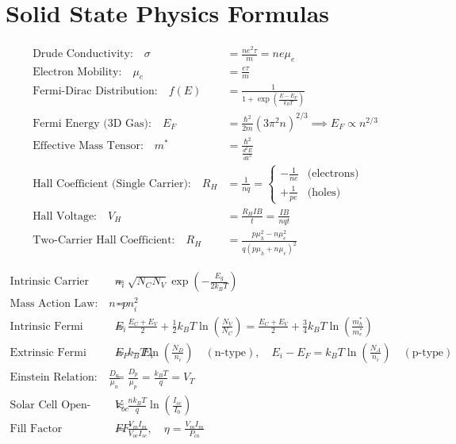 \chapter{Solid State Physics Formulas}

\begin{formulabox}
\begin{align}
\text{Drude Conductivity:} \quad \sigma &= \frac{n e^2 \tau}{m} = n e \mu_e \\
\text{Electron Mobility:} \quad \mu_e &= \frac{e \tau}{m} \\
\text{Fermi-Dirac Distribution:} \quad f(E) &= \frac{1}{1 + \exp\left(\frac{E - E_F}{k_B T}\right)} \\
\text{Fermi Energy (3D Gas):} \quad E_F &= \frac{\hbar^2}{2m}\left(3\pi^2 n\right)^{2/3} \implies E_F \propto n^{2/3} \\
\text{Effective Mass Tensor:} \quad m^* &= \frac{\hbar^2}{\frac{d^2E}{dk^2}} \\
\text{Hall Coefficient (Single Carrier):} \quad R_H &= \frac{1}{n q} = \begin{cases} -\frac{1}{n e} & \text{(electrons)} \\ +\frac{1}{p e} & \text{(holes)} \end{cases} \\
\text{Hall Voltage:} \quad V_H &= \frac{R_H I B}{t} = \frac{I B}{n q t} \\
\text{Two-Carrier Hall Coefficient:} \quad R_H &= \frac{p \mu_h^2 - n \mu_e^2}{q (p \mu_h + n \mu_e)^2}
\end{align}
\end{formulabox}

\begin{formulabox}
\begin{align}
\text{Intrinsic Carrier Concentration:} \quad n_i &= \sqrt{N_C N_V} \exp\left(-\frac{E_g}{2 k_B T}\right) \\
\text{Mass Action Law:} \quad n \cdot p &= n_i^2 \\
\text{Intrinsic Fermi Level:} \quad E_i &= \frac{E_C + E_V}{2} + \frac{1}{2} k_B T \ln\left(\frac{N_V}{N_C}\right) = \frac{E_C + E_V}{2} + \frac{3}{4} k_B T \ln\left(\frac{m_h^*}{m_e^*}\right) \\
\text{Extrinsic Fermi Shifts:} \quad E_F - E_i &= k_B T \ln\left(\frac{N_D}{n_i}\right) \quad (\text{n-type}), \quad E_i - E_F = k_B T \ln\left(\frac{N_A}{n_i}\right) \quad (\text{p-type}) \\
\text{Einstein Relation:} \quad \frac{D_n}{\mu_n} &= \frac{D_p}{\mu_p} = \frac{k_B T}{q} = V_T \\
\text{Solar Cell Open-Circuit Voltage:} \quad V_{oc} &\approx \frac{n k_B T}{q}\ln\left(\frac{I_{sc}}{I_0}\right) \\
\text{Fill Factor \& Efficiency:} \quad FF &= \frac{V_m I_m}{V_{oc} I_{sc}}, \quad \eta = \frac{V_m I_m}{P_{in}}
\end{align}
\end{formulabox}
